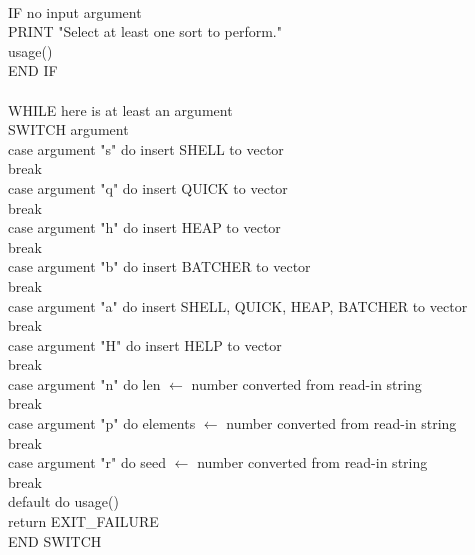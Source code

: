 \documentclass[12pt]{article}
\begin{document}
\\
\indent IF no input argument \\
\indent \indent PRINT "Select at least one sort to perform." \\
\indent \indent usage() \\
\indent END IF \\
\\
\indent WHILE here is at least an argument \\
\indent \indent SWITCH argument \\
\indent \indent \indent case argument "s" do insert SHELL to vector \\
\indent \indent \indent \indent break \\
\indent \indent \indent case argument "q" do insert QUICK to vector \\
\indent \indent \indent \indent break \\
\indent \indent \indent case argument "h" do insert HEAP to vector \\
\indent \indent \indent \indent break \\
\indent \indent \indent case argument "b" do insert BATCHER to vector \\
\indent \indent \indent \indent break \\
\indent \indent \indent case argument "a" do insert SHELL, QUICK, HEAP, BATCHER to vector \\
\indent \indent \indent \indent break \\
\indent \indent \indent case argument "H" do insert HELP to vector \\
\indent \indent \indent \indent break \\
\indent \indent \indent case argument "n" do len $\leftarrow$ number converted from read-in string \\
\indent \indent \indent \indent break \\
\indent \indent \indent case argument "p" do elements $\leftarrow$ number converted from read-in string \\
\indent \indent \indent \indent break \\
\indent \indent \indent case argument "r" do seed $\leftarrow$ number converted from read-in string \\
\indent \indent \indent \indent break \\
\indent \indent \indent default do usage() \\
\indent \indent \indent \indent return EXIT\_FAILURE \\
\indent \indent END SWITCH \\
\end{document}
